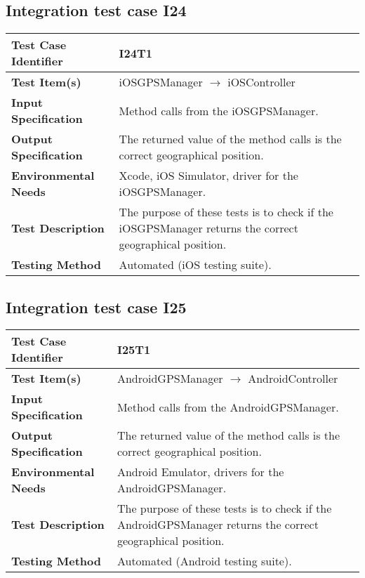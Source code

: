 \vspace{2em}

\subsection {Integration test case I24}

\indent

\vspace{1em}

\begin{tabular}{l p{}}
    \hline
    \textbf{Test Case Identifier} & I24T1\\
    \hline
    \textbf{Test Item(s)} & iOSGPSManager $\rightarrow$ iOSController \\
    \hline
    \textbf{Input Specification} &  Method calls from the iOSGPSManager. \\
    \hline
    \textbf{Output Specification} &  The returned value of the method calls is the correct geographical position.  \\
    \hline
    \textbf{Environmental Needs} & Xcode, iOS Simulator, driver for the iOSGPSManager. \\
    \hline
    \textbf{Test Description} & The purpose of these tests is to check if the iOSGPSManager returns the correct geographical position.  \\
    \hline
    \textbf{Testing Method} & Automated (iOS testing suite). \\
    \hline
\end{tabular}

\vspace{2em}

\subsection {Integration test case I25}

\indent

\vspace{1em}

\begin{tabular}{l p{}}
    \hline
    \textbf{Test Case Identifier} & I25T1\\
    \hline
    \textbf{Test Item(s)} & AndroidGPSManager $\rightarrow$ AndroidController \\
    \hline
    \textbf{Input Specification} &  Method calls from the AndroidGPSManager. \\
    \hline
    \textbf{Output Specification} &  The returned value of the method calls is the correct geographical position.  \\
    \hline
    \textbf{Environmental Needs} & Android Emulator, drivers for the AndroidGPSManager. \\
    \hline
    \textbf{Test Description} & The purpose of these tests is to check if the AndroidGPSManager returns the correct geographical position.  \\
    \hline
    \textbf{Testing Method} & Automated (Android testing suite). \\
    \hline
\end{tabular}

